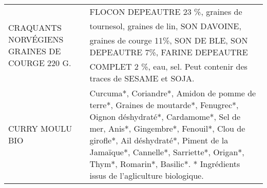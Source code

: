 \begin{longtable}{p{5cm}p{10cm}}
                                                            CRAQUANTS NORVÉGIENS GRAINES DE COURGE 220 G. &                                                                                                                                                                                                                                                                                                                                                                                                                                                                                                                                                                                                                                                                                                                                                                                                                   FLOCON DEPEAUTRE 23 \%, graines de tournesol, graines de lin, SON DAVOINE, graines de courge 11\%, SON DE BLE, SON DEPEAUTRE 7\%, FARINE DEPEAUTRE COMPLET 2 \%, eau, sel. Peut contenir des traces de SESAME et SOJA. \\
                                                                                          CURRY MOULU BIO &                                                                                                                                                                                                                                                                                                                                                                                                                                                                                                                                                                                                                                                                                                       Curcuma*, Coriandre*, Amidon de pomme de terre*, Graines de moutarde*, Fenugrec*, Oignon déshydraté*, Cardamome*, Sel de mer, Anis*, Gingembre*, Fenouil*, Clou de girofle*, Ail déshydraté*, Piment de la Jamaïque*, Cannelle*, Sarriette*, Origan*, Thym*, Romarin*, Basilic*.  * Ingrédients issus de l'agliculture biologique. \\

\end{longtable}
